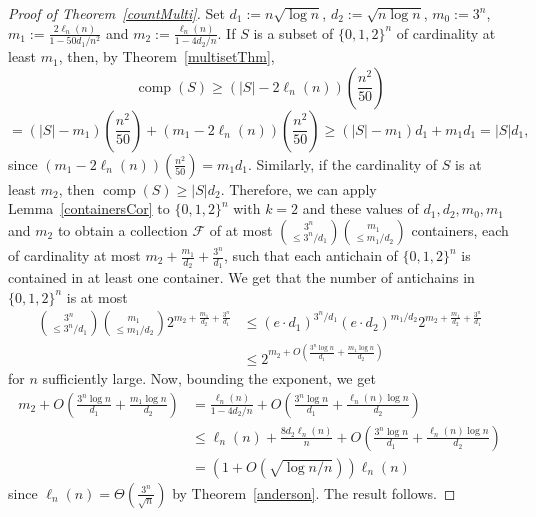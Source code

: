 \documentclass[11 pt]{article}
\theoremstyle{definition}
\theoremstyle{case}
\numberwithin{equation}{section}
\DeclareMathOperator{\comp}{comp}
\begin{document}
\begin{proof}[Proof of Theorem~\ref{countMulti}]
Set $d_1:=n\sqrt{\log{n}}$, $d_2:=\sqrt{n\log{n}}$, $m_0:=3^n$, $m_1:=\frac{2\ell_n(n)}{1-50d_1/n^2}$ and $m_2:=\frac{\ell_n(n)}{1-4d_2/n}$. If $S$ is a subset of $\{0,1,2\}^n$ of cardinality at least $m_1$, then, by Theorem~\ref{multisetThm},
\[\comp(S)\geq \left(|S| - 2\ell_n(n)\right)\left(\frac{n^2}{50}\right)\]
\[ = \left(|S|-m_1\right)\left(\frac{n^2}{50}\right) + \left(m_1 - 2\ell_n(n)\right)\left(\frac{n^2}{50}\right) \geq (|S|-m_1)d_1 + m_1d_1 = |S|d_1,\]
since $\left(m_1-2\ell_n(n)\right)\left(\frac{n^2}{50}\right) = m_1d_1$.  Similarly, if the cardinality of $S$ is at least $m_2$, then $\comp(S)\geq |S|d_2$. Therefore, we can apply Lemma~\ref{containersCor} to $\{0,1,2\}^n$ with $k=2$ and these values of $d_1,d_2,m_0,m_1$ and $m_2$ to obtain a collection $\mathcal{F}$ of at most $\binom{3^n}{\leq 3^n/d_1}\binom{m_1}{\leq m_1/d_2}$ containers, each of cardinality at most $m_2+\frac{m_1}{d_2} + \frac{3^n}{d_1}$, such that each antichain of $\{0,1,2\}^n$ is contained in at least one container. We get that the number of antichains in $\{0,1,2\}^n$ is at most
\begin{align*}
\binom{3^n}{\leq 3^n/d_1}\binom{m_1}{\leq m_1/d_2}2^{m_2+\frac{m_1}{d_2} + \frac{3^n}{d_1}}&\leq \left(e\cdot d_1\right)^{3^n/d_1}\left(e\cdot d_2\right)^{m_1/d_2}2^{m_2+\frac{m_1}{d_2} + \frac{3^n}{d_1}}\\
&\leq 2^{m_2 + O\left(\frac{3^n\log{n}}{d_1} + \frac{m_1\log{n}}{d_2}\right)}\end{align*}
for $n$ sufficiently large. Now, bounding the exponent, we get
\begin{align*} m_2 + O\left(\frac{3^n\log{n}}{d_1} + \frac{m_1\log{n}}{d_2}\right)&= \frac{\ell_n(n)}{1-4d_2/n} + O\left(\frac{3^n\log{n}}{d_1} + \frac{\ell_n(n)\log{n}}{d_2}\right)\\
&\leq \ell_n(n) + \frac{8d_2\ell_n(n)}{n}  + O\left(\frac{3^n\log{n}}{d_1} + \frac{\ell_n(n)\log{n}}{d_2}\right)\\
& = \left(1+O\left(\sqrt{\log{n}/n}\right)\right)\ell_n(n)\end{align*}
since $\ell_n(n) =\Theta\left(\frac{3^n}{\sqrt{n}}\right)$ by Theorem~\ref{anderson}. The result follows.
\end{proof}
\end{document}
